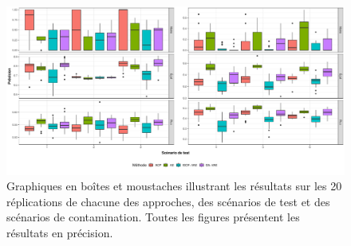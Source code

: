 \begin{figure}[H]
	\centering
	\includegraphics[width=\linewidth]{images/images_boxplots/precision_mnist.pdf}
	\caption{Graphiques en boîtes et moustaches illustrant les résultats sur les 20 réplications de chacune des approches, des scénarios de test et des scénarios de contamination. Toutes les figures présentent les résultats en précision.}
	\label{fig:precision_mnist}
\end{figure}

